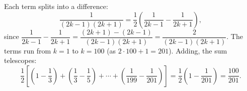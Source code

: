 Each term splits into a difference:
\[\dfrac{1}{(2k-1)(2k+1)}=\dfrac12\left(\dfrac1{2k-1}-\dfrac1{2k+1}\right),\]
since $\dfrac1{2k-1}-\dfrac1{2k+1}=\dfrac{(2k+1)-(2k-1)}{(2k-1)(2k+1)}=\dfrac{2}{(2k-1)(2k+1)}$. The terms run from $k=1$ to $k=100$ (as $2\cdot100+1=201$). Adding, the sum telescopes:
\[\dfrac12\left[\left(1-\dfrac13\right)+\left(\dfrac13-\dfrac15\right)+\cdots+\left(\dfrac1{199}-\dfrac1{201}\right)\right]=\dfrac12\left(1-\dfrac1{201}\right)=\boxed{\dfrac{100}{201}}.\]
